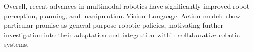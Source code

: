 \documentclass[conference, 12pt]{IEEEtran}
\begin{document}
Overall, recent advances in multimodal robotics have significantly improved robot perception, planning, and manipulation. Vision--Language--Action models show particular promise as general-purpose robotic policies, motivating further investigation into their adaptation and integration within collaborative robotic systems.






\end{document}
